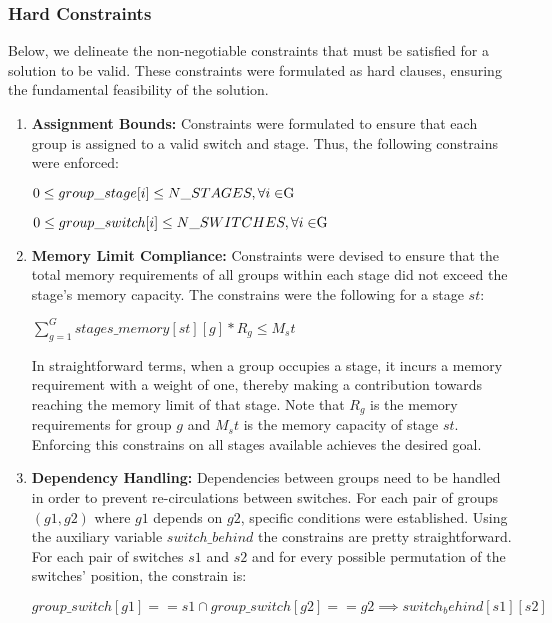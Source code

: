 \subsubsection{Hard Constraints}

Below, we delineate the non-negotiable constraints that must be satisfied for a solution to be valid. These constraints were formulated as hard clauses, ensuring the fundamental feasibility of the solution.

\begin{enumerate}
    \item \textbf{Assignment Bounds:} Constraints were formulated to ensure that each group is assigned to a valid switch and stage. Thus, the following constrains were enforced:
    \begin{center}
        \(0 \leq group\_stage[i] \le N\_STAGES, \forall i \in $G$ \)
        
        \(0 \leq group\_switch[i] \le N\_SWITCHES, \forall i \in $G$ \)
    \end{center}

    \item \textbf{Memory Limit Compliance:} Constraints were devised to ensure that the total memory requirements of all groups within each stage did not exceed the stage's memory capacity. The constrains were the following for a stage $st$:
    \begin{center}
        \(\sum_{g=1}^{G} stages\_memory[st][g] * R_g \leq M_st \)
    \end{center}
    In straightforward terms, when a group occupies a stage, it incurs a memory requirement with a weight of one, thereby making a contribution towards reaching the memory limit of that stage. Note that $R_g$ is the memory requirements for group $g$ and $M_st$ is the memory capacity of stage $st$. Enforcing this constrains on all stages available achieves the desired goal.

    \item \textbf{Dependency Handling:} Dependencies between groups need to be handled in order to prevent re-circulations between switches. For each pair of groups \((g1, g2)\) where \(g1\) depends on \(g2\), specific conditions were established. Using the auxiliary variable $switch\_behind$ the constrains are pretty straightforward. For each pair of switches $s1$ and $s2$ and for every possible permutation of the switches' position, the constrain is:
    \begin{center}
        \(group\_switch[g1] == s1 \cap group\_switch[g2] == g2 \implies switch_behind[s1][s2]  \)
        
    \end{center}
\end{enumerate}

